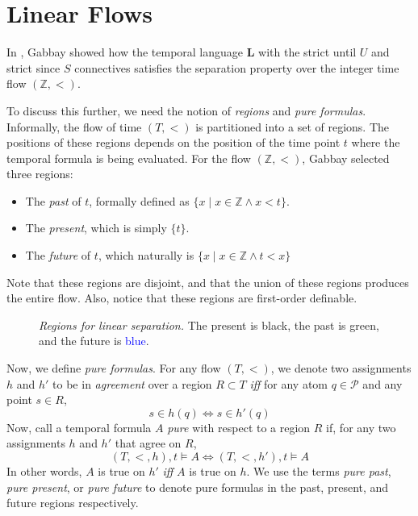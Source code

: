 \documentclass[a4paper,UKenglish,cleveref, autoref, thm-restate, numberwithinsect]{lipics-v2021}
\begin{document}
\section{Linear Flows}
\label{sec:linear-time}

In \cite{gabbay1994}, Gabbay showed how the temporal language $\mathbf{L}$ with the \textsf{strict until} $U$ and \textsf{strict since} $S$ connectives satisfies the separation property over the integer time flow $(\mathbb{Z}, <)$.

To discuss this further, we need the notion of \textit{regions} and \textit{pure formulas}. Informally, the flow of time $(T, <)$ is partitioned into a set of regions. The positions of these regions depends on the position of the time point $t$ where the temporal formula is being evaluated. For the flow $(\mathbb{Z}, <)$, Gabbay selected three regions:
\begin{itemize}
    \item The \textit{past} of $t$, formally defined as $\{ x \mid x \in \mathbb{Z} \land x < t\}$.
    \item The \textit{present}, which is simply $\{ t \}$.
    \item The \textit{future} of $t$, which naturally is $\{x \mid x \in \mathbb{Z} \land t < x\}$
\end{itemize}
Note that these regions are disjoint, and that the union of these regions produces the entire flow. Also, notice that these regions are first-order definable.

\begin{figure}
    \centering
    \caption[]{\emph{Regions for linear separation.} The present is black, the past is \textcolor{OliveGreen}{green}, and the future is \textcolor{blue}{blue}.}
    \label{fig:linear-separation-regions}
\end{figure}

Now, we define \textit{pure formulas}. For any flow $(T, <)$, we denote two assignments $h$ and $h'$ to be in \textit{agreement} over a region $R \subset T$ \textit{iff} for any atom $q \in \mathcal{P}$ and any point $s \in R$,
\begin{equation*}
    s \in h(q) \Longleftrightarrow s \in h'(q)
\end{equation*}
Now, call a temporal formula $A$ \textit{pure} with respect to a region $R$ if, for any two assignments $h$ and $h'$ that agree on $R$,
\begin{equation*}
    (T, <, h), t \vDash A \Longleftrightarrow (T, <, h'), t \vDash A
\end{equation*}
In other words, $A$ is true on $h'$ \textit{iff} $A$ is true on $h$. We use the terms \textit{pure past}, \textit{pure present}, or \textit{pure future} to denote pure formulas in the past, present, and future regions respectively.
\end{document}
